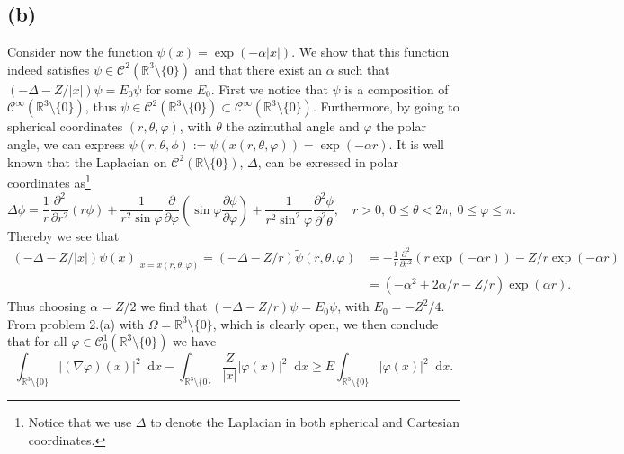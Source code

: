 \documentclass[a4paper,11pt]{article}
\newcommand{\abs}[1]{\left\lvert #1 \right\rvert}
\newcommand*\diff{\mathop{}\!\mathrm{d}}
\newcommand{\R}{\mathbb{R}}
\numberwithin{equation}{section}
\begin{document}
\subsection*{(b)} Consider now the function $ \psi(x)=\exp(-\alpha\abs{x}) $. We show that this function indeed satisfies $ \psi\in \mathcal{C}^2(\R^3\setminus\{0\}) $ and that there exist an $ \alpha $ such that $ (-\Delta-Z/\abs{x})\psi=E_0\psi $ for some $ E_0 $. First we notice that $ \psi $ is a composition of $ \mathcal{C}^\infty(\R^3\setminus\{0\}) $, thus $ \psi\in\mathcal{C}^2(\R^3\setminus\{0\})\subset\mathcal{C}^\infty(\R^3\setminus\{0\}) $. Furthermore, by going to spherical coordinates $ (r,\theta,\varphi) $, with $ \theta $ the azimuthal angle and $ \varphi $ the polar angle, we can express $ \tilde{\psi}(r,\theta,\phi):=\psi(x(r,\theta,\varphi))=\exp(-\alpha r) $. It is well known that the Laplacian on $ \mathcal{C}^2(\R\setminus\{0\}) $, $ \Delta $, can be exressed in polar coordinates as\footnote{Notice that we use $ \Delta $ to denote the Laplacian in both spherical and Cartesian coordinates.} \begin{equation}
\Delta\phi=\frac{1}{r}\frac{\partial^2}{\partial r^2}(r\phi)+\frac{1}{r^2\sin\varphi}\frac{\partial}{\partial\varphi}(\sin\varphi\frac{\partial\phi}{\partial\varphi})+\frac{1}{r^2\sin^2\varphi}\frac{\partial^2\phi}{\partial^2\theta}, \quad r>0,\ 0\leq\theta<2\pi,\ 0\leq\varphi\leq\pi.
\end{equation}
Thereby we see that \begin{equation*}
\begin{aligned}
(-\Delta-Z/\abs{x})\psi(x)\rvert_{x=x(r,\theta,\varphi)}=(-\Delta-Z/r)\tilde{\psi}(r,\theta,\varphi)&=-\frac{1}{r}\frac{\partial^2}{\partial r^2}(r \exp(-\alpha r))-Z/r\exp(-\alpha r)\\
&=(-\alpha^2+2\alpha/r-Z/r)\exp(\alpha r).
\end{aligned}
\end{equation*} 
Thus choosing $ \alpha=Z/2 $ we find that $ (-\Delta-Z/r)\psi=E_0\psi $, with  $ E_0=-Z^2/4 $. From problem 2.(a) with $ \Omega=\R^3\setminus\{0\} $, which is clearly open, we then conclude that for all $ \varphi\in\mathcal{C}_0^1(\R^3\setminus\{0\}) $ we have 
\begin{equation}
\int_{\R^3\setminus\{0\}}\lvert(\nabla\varphi)(x) \rvert^2\diff x-\int_{\R^3\setminus\{0\}}\frac{Z}{\abs{x}}\lvert\varphi(x)\rvert^2 \diff x\geq E\int_{\R^3\setminus\{0\}}\lvert\varphi(x)\rvert^2 \diff x.
\end{equation}
\end{document}
